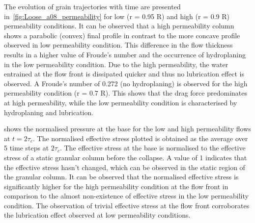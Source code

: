 The evolution of grain trajectories with time are presented 
in~\cref{fig:Loose_a08_permeability} for low (r = 0.95 R) and high (r = 0.9 R)
permeability conditions. It can be observed that a high 
permeability column shows a parabolic (convex) final profile in contrast to the 
more concave profile observed in low permeability condition. This difference in 
the flow thickness results in a higher value of Froude's number and the 
occurrence of hydroplaning in the low permeability condition. Due to the high 
permeability, the water entrained at the flow front is dissipated quicker and 
thus no lubrication effect is observed. A Froude's number of 0.272 (no 
hydroplaning) is observed for the high permeability condition (r = 0.7 R). This 
shows that the drag force predominates at high permeability, while the low 
permeability condition is characterised by hydroplaning and lubrication.

 shows the normalised pressure at the 
base for the low and high permeability flows at $ t = 2\tau_c$. The normalised 
effective stress plotted is obtained as the average over 5 time steps at 
$2\tau_c$. The effective stress at the base is normalised to the effective 
stress of a static granular column before the collapse. A value of 1 indicates 
that 
the effective stress hasn't changed, which can be observed in the static region 
of 
the granular column. It can be observed that the normalised effective stress is 
significantly higher for the high permeability condition at the flow front in 
comparison to the almost non-existence of effective stress in the low 
permeability condition. The observation of trivial effective stress at the flow 
front 
corroborates the lubrication effect observed at low permeability conditions.

